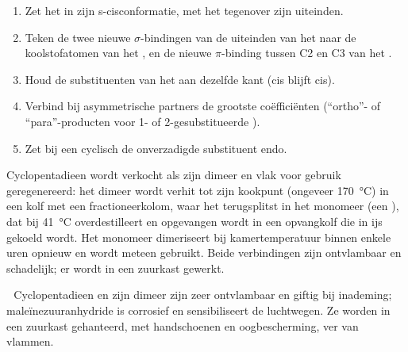 \begin{method}\label{met:b2:frontier-orbitals:diels-alder}
\begin{enumerate}
  \item Zet het  in zijn s-cisconformatie, met het  tegenover zijn uiteinden.
  \item Teken de twee nieuwe $\sigma$-bindingen van de uiteinden van het  naar de koolstofatomen van het ,
        en de nieuwe $\pi$-binding tussen C2 en C3 van het .
  \item Houd de substituenten van het  aan dezelfde kant (cis blijft cis).
  \item Verbind bij asymmetrische partners de grootste coëfficiënten (``ortho''- of ``para''-producten
        voor 1- of 2-gesubstitueerde ).
  \item Zet bij een cyclisch  de onverzadigde substituent endo.
\end{enumerate}
\end{method}

\begin{inthelab}
Cyclopentadieen wordt verkocht als zijn dimeer en vlak voor gebruik geregenereerd: het dimeer wordt
verhit tot zijn kookpunt (ongeveer \qty{170}{\degreeCelsius}) in een kolf met een
fractioneerkolom, waar het terugsplitst in het monomeer (een ),
dat bij \qty{41}{\degreeCelsius} overdestilleert en opgevangen wordt in een opvangkolf die in ijs
gekoeld wordt. Het monomeer dimeriseert bij kamertemperatuur binnen enkele uren opnieuw en wordt meteen
gebruikt. Beide verbindingen zijn ontvlambaar en schadelijk; er wordt in een zuurkast gewerkt.
\end{inthelab}

\begin{safety}{\,\,}
Cyclopentadieen en zijn dimeer zijn zeer ontvlambaar en giftig bij inademing; maleïnezuuranhydride
is corrosief en sensibiliseert de luchtwegen. Ze worden in een zuurkast gehanteerd,
met handschoenen en oogbescherming, ver van vlammen.
\end{safety}


